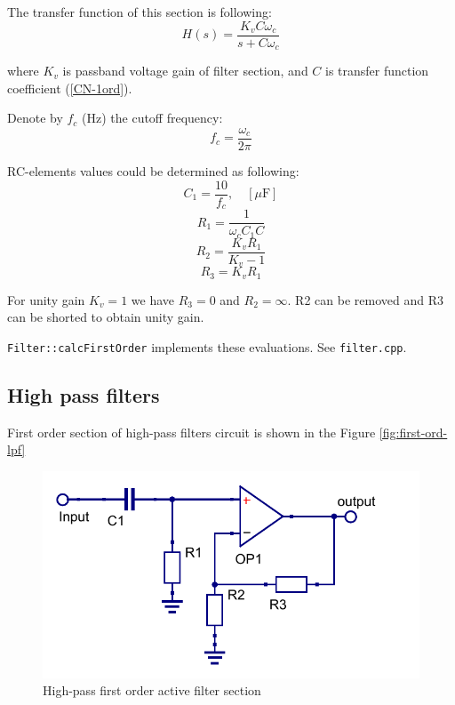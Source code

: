 The transfer function of this section is following:
\begin{equation}
 H(s)=\frac{K_{v}C\omega_c}{s+C\omega_c}
\end{equation}

where $K_{v}$ is passband voltage gain of filter section, and $C$ is transfer
function coefficient (\ref{CN-1ord}). 

Denote by $f_c$ (Hz) the cutoff frequency:
\begin{equation}
 f_c = \frac{\omega_c}{2\pi}
\end{equation}

RC-elements values could be determined as following:
\begin{equation}
 C_1 = \frac{10}{f_c}, \quad [\mu\mbox{F}]
\end{equation}
\begin{equation}
 R_1=\frac{1}{\omega_cC_1C}
\end{equation}
\begin{equation}
 R_2=\frac{K_vR_1}{K_v-1} \label{R2-1ord}
\end{equation}
\begin{equation}
 R_3=K_vR_1 \label{R3-1ord}
\end{equation}

For unity gain $K_v=1$ we have $R_3=0$ and $R_2=\infty$. R2 can be removed and
R3 can be shorted to obtain unity gain. 

\verb|Filter::calcFirstOrder| implements these evaluations. See
\verb|filter.cpp|.

\subsection{High pass filters}

First order section of high-pass filters circuit is shown in the Figure
\ref{fig:first-ord-lpf}

\begin{figure}[!ht]
  \centering
  \includegraphics[width=0.5\linewidth]{pics/first-ord-hpf}
  \caption{High-pass first order active filter section}
  \label{fig:first-ord-hpf}
\end{figure}

